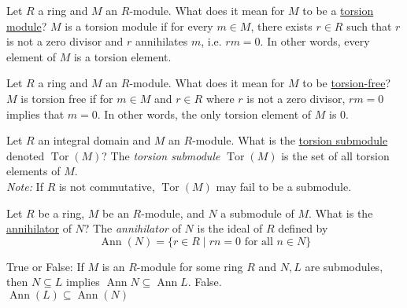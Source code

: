 \documentclass[avery5371,grid]{flashcards}
\DeclareMathOperator{\Tor}{Tor}
\DeclareMathOperator{\Ann}{Ann}
\begin{document}
\begin{flashcard}[Modules]{Let $R$ a ring and $M$ an $R$-module. What does it mean for $M$ to be a \underline{torsion module}?}
 $M$ is a torsion module if for every $m \in M$, there exists $r \in R$ such that $r$ is not a zero divisor and $r$ annihilates $m$, i.e. $rm = 0$. In other words, every element of $M$ is a torsion element.
\end{flashcard}

\begin{flashcard}[Modules]{Let $R$ a ring and $M$ an $R$-module. What does it mean for $M$ to be \underline{torsion-free}?}
 $M$ is torsion free if for $m \in M$ and $r \in R$ where $r$ is not a zero divisor, $rm = 0$ implies that $m=0$. In other words, the only torsion element of $M$ is 0.
\end{flashcard}

\begin{flashcard}[Modules]{Let $R$ an integral domain and $M$ an $R$-module. What is the \underline{torsion submodule} denoted $\Tor(M)$?}
 The \emph{torsion submodule} $\Tor(M)$ is the set of all torsion elements of $M$. \\
 
 \emph{Note: }If $R$ is not commutative, $\Tor(M)$ may fail to be a submodule.
\end{flashcard}

\begin{flashcard}[Modules]{Let $R$ be a ring, $M$ be an $R$-module, and $N$ a submodule of $M$. What is the \underline{annihilator} of $N$?}
 The \emph{annihilator} of $N$ is the ideal of $R$ defined by
 $$
 \Ann(N) = \{r \in R \mid rn = 0 \text{ for all } n \in N \}
 $$
\end{flashcard}

\begin{flashcard}[Modules]{True or False: If $M$ is an $R$-module for some ring $R$ and $N,L$ are submodules, then $N \subseteq L$ implies $\Ann{N} \subseteq \Ann{L}$.}
 False. \\
 
 $\Ann(L) \subseteq \Ann(N)$
\end{flashcard}
\end{document}
